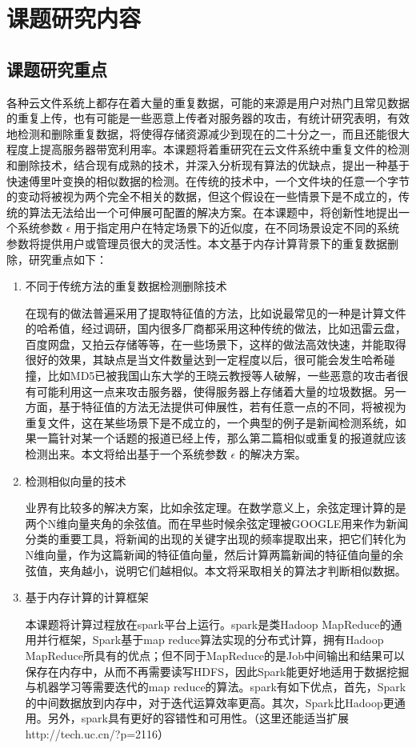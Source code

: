 \section{课题研究内容}
\subsection{课题研究重点}
\label{sec:point1}
各种云文件系统上都存在着大量的重复数据，可能的来源是用户对热门且常见数据的重复上传，也有可能是一些恶意上传者对服务器的攻击，有统计研究表明，有效地检测和删除重复数据，将使得存储资源减少到现在的二十分之一，而且还能很大程度上提高服务器带宽利用率。本课题将着重研究在云文件系统中重复文件的检测和删除技术，结合现有成熟的技术，并深入分析现有算法的优缺点，提出一种基于快速傅里叶变换的相似数据的检测。在传统的技术中，一个文件块的任意一个字节的变动将被视为两个完全不相关的数据，但这个假设在一些情景下是不成立的，传统的算法无法给出一个可伸展可配置的解决方案。在本课题中，将创新性地提出一个系统参数 $\epsilon$ 用于指定用户在特定场景下的近似度，在不同场景设定不同的系统参数将提供用户或管理员很大的灵活性。本文基于内存计算背景下的重复数据删除，研究重点如下：

\begin{enumerate}
\item 不同于传统方法的重复数据检测删除技术

在现有的做法普遍采用了提取特征值的方法，比如说最常见的一种是计算文件的哈希值，经过调研，国内很多厂商都采用这种传统的做法，比如迅雷云盘，百度网盘，又拍云存储等等，在一些场景下，这样的做法高效快速，并能取得很好的效果，其缺点是当文件数量达到一定程度以后，很可能会发生哈希碰撞，比如MD5已被我国山东大学的王晓云教授等人破解，一些恶意的攻击者很有可能利用这一点来攻击服务器，使得服务器上存储着大量的垃圾数据。另一方面，基于特征值的方法无法提供可伸展性，若有任意一点的不同，将被视为重复文件，这在某些场景下是不成立的，一个典型的例子是新闻检测系统，如果一篇针对某一个话题的报道已经上传，那么第二篇相似或重复的报道就应该检测出来。本文将给出基于一个系统参数 $\epsilon$ 的解决方案。

\item 检测相似向量的技术

业界有比较多的解决方案，比如余弦定理。在数学意义上，余弦定理计算的是两个N维向量夹角的余弦值。而在早些时候余弦定理被GOOGLE用来作为新闻分类的重要工具，将新闻的出现的关键字出现的频率提取出来，把它们转化为N维向量，作为这篇新闻的特征值向量，然后计算两篇新闻的特征值向量的余弦值，夹角越小，说明它们越相似。本文将采取相关的算法才判断相似数据。

\item 基于内存计算的计算框架

本课题将计算过程放在spark平台上运行。spark是类Hadoop MapReduce的通用并行框架，Spark基于map reduce算法实现的分布式计算，拥有Hadoop MapReduce所具有的优点；但不同于MapReduce的是Job中间输出和结果可以保存在内存中，从而不再需要读写HDFS，因此Spark能更好地适用于数据挖掘与机器学习等需要迭代的map reduce的算法。spark有如下优点，首先，Spark的中间数据放到内存中，对于迭代运算效率更高。其次，Spark比Hadoop更通用。另外，spark具有更好的容错性和可用性。（这里还能适当扩展http://tech.uc.cn/?p=2116）

\end{enumerate}

